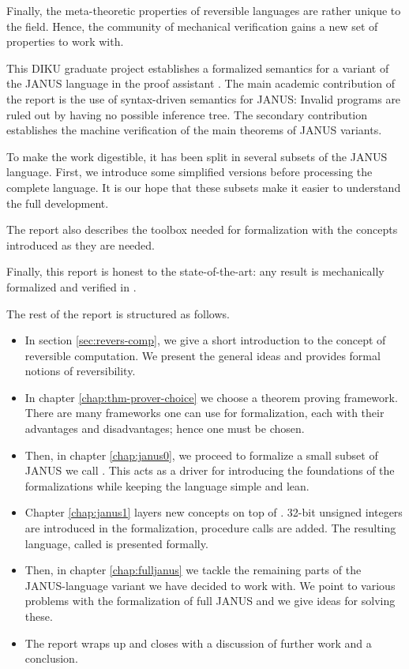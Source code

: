 Finally, the meta-theoretic properties of reversible languages are
rather unique to the field. Hence, the community of mechanical
verification gains a new set of properties to work with.

This DIKU graduate project establishes a formalized semantics for
a variant of the JANUS language in the proof assistant \coq{}. The
main academic contribution of the report is the use of syntax-driven
semantics for JANUS: Invalid programs are ruled out by having no possible
inference tree. The secondary contribution establishes the machine
verification of the main theorems of JANUS variants.

To make the work digestible, it has been split in several subsets of
the JANUS language. First, we introduce some simplified versions
before processing the complete language. It is our hope that these
subsets make it easier to understand the full development.

The report also describes the toolbox needed for formalization with
the concepts introduced as they are needed.

Finally, this report is honest to the state-of-the-art: any result is
mechanically formalized and verified in \coq{}.

The rest of the report is structured as follows.
\begin{itemize}
\item In section \ref{sec:revers-comp}, we give a short introduction
  to the concept of reversible computation. We present the general
  ideas and provides formal notions of reversibility.
\item In chapter \ref{chap:thm-prover-choice} we choose a theorem proving
  framework. There are many frameworks one can use for formalization,
  each with their advantages and disadvantages; hence one must be chosen.
\item Then, in chapter \ref{chap:janus0}, we proceed to formalize a
  small subset of JANUS we call \janusz{}. This acts as a driver for
  introducing the foundations of the formalizations while keeping the
  language simple and lean.
\item Chapter \ref{chap:janus1} layers new concepts on top of
  \janusz{}. 32-bit unsigned integers are introduced in the
  formalization, procedure calls are added. The resulting language,
  called \januso{} is presented formally.
\item Then, in chapter \ref{chap:fulljanus} we tackle the remaining
  parts of the JANUS-language variant we have decided to work with. We
  point to various problems with the formalization of full JANUS and
  we give ideas for solving these.
\item The report wraps up and closes with a discussion of further work
  and a conclusion.
\end{itemize}

